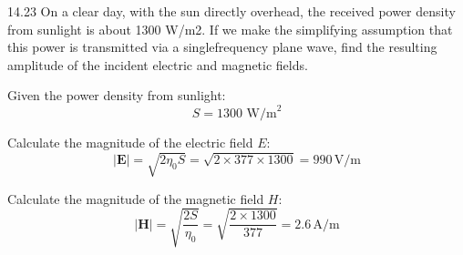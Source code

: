 \documentclass[cn,12pt]{homework}
\begin{document}
14.23 On a clear day, with the sun directly overhead, the received power density from sunlight is about
1300 W/m2. If we make the simplifying assumption that this power is transmitted via a singlefrequency plane wave, find the resulting amplitude of the incident electric and magnetic fields.
\begin{solution}
  Given the power density from sunlight:
\[ S = 1300 \text{ W/m}^2 \]

Calculate the magnitude of the electric field \( E \):
\[ |\mathbf{E}| = \sqrt{2 \eta_0 S} = \sqrt{2\times377\times1300} = 990 \, \text{V/m} \]

Calculate the magnitude of the magnetic field \( H \):
\[ |\mathbf{H}| = \sqrt{\frac{2S}{\eta_0}} = \sqrt{\frac{2 \times 1300}{377}} = 2.6 \, \text{A/m} \]
\end{solution}
\newpage




\end{document}
